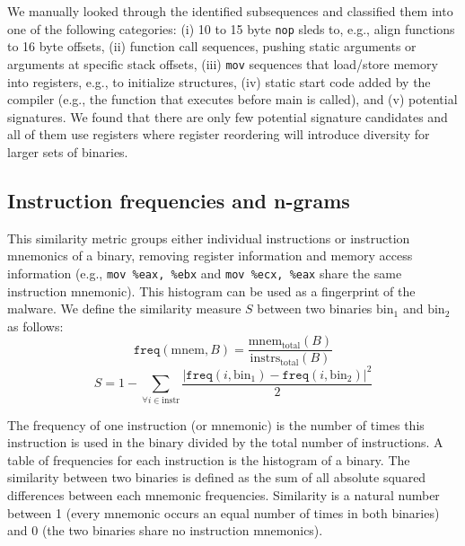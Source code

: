 \documentclass[letterpaper,twocolumn,10pt]{article}
\begin{document}
We manually looked through the identified subsequences and classified them into
one of the following categories: (i) 10 to 15 byte \texttt{nop} sleds to, e.g.,
align functions to 16 byte offsets, (ii) function call sequences, pushing static
arguments or arguments at specific stack offsets, (iii) \texttt{mov} sequences
that load/store memory into registers, e.g., to initialize structures, (iv)
static start code added by the compiler (e.g., the function that executes before
main is called), and (v) potential signatures. We found that there are only few
potential signature candidates and all of them use registers where register
reordering will introduce diversity for larger sets of binaries.


\subsection{Instruction frequencies and n-grams}

This similarity metric groups either individual instructions or instruction
mnemonics of a binary, removing register information and memory access
information (e.g., \texttt{mov \%eax, \%ebx} and \texttt{mov \%ecx, \%eax} share
the same instruction mnemonic).  This histogram can be used as a fingerprint of
the malware. We define the similarity measure $S$ between two binaries
$\mathrm{bin}_{1}$ and $\mathrm{bin}_{2}$ as follows:
\[
\mathtt{freq}(\mathrm{mnem}, B) = \frac{\mathrm{mnem}_{\mathrm{total}}(B)}{\mathrm{instrs}_{\mathrm{total}}(B)}
\]
\[
S = 1 - \sum\limits_{\forall i \in \mathrm{instr}} \frac{| \mathtt{freq}(i, \mathrm{bin}_{\mathrm{1}}) -
  \mathtt{freq}(i, \mathrm{bin}_{\mathrm{2}}) |^{2}}{2}
\]

The frequency of one instruction (or mnemonic) is the number of times this
instruction is used in the binary divided by the total number of instructions. A
table of frequencies for each instruction is the histogram of a binary. The
similarity between two binaries is defined as the sum of all absolute squared
differences between each mnemonic frequencies.  Similarity is a natural number
between 1 (every mnemonic occurs an equal number of times in both binaries) and
0 (the two binaries share no instruction mnemonics).
\end{document}
